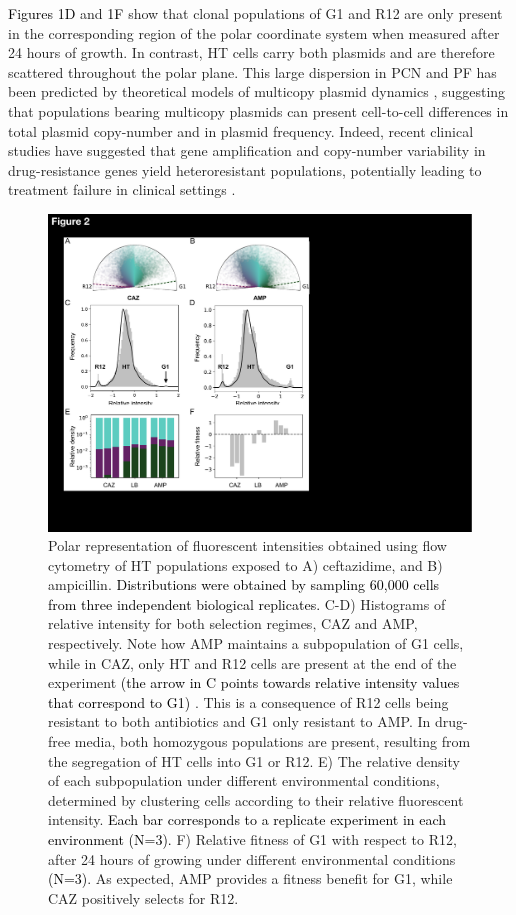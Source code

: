 \documentclass[fleqn,12pt]{wlscirep}
\newcommand{\blue}[1]{\textcolor{black}{#1}}
\newcommand{\fig}[1]{\textcolor{black}{#1}}
\begin{document}
 \fig{Figures 1D} and \fig{1F} show that clonal populations of G1 and R12 are only present in the corresponding region of the polar coordinate system when measured after 24 hours of growth.  
In contrast, HT cells carry both plasmids and are therefore scattered throughout the polar plane. This large dispersion in PCN and PF has been predicted by theoretical models of multicopy plasmid dynamics \cite{pena2015evaluating, Munch2019}, suggesting that populations bearing multicopy plasmids can present cell-to-cell differences in total plasmid copy-number and in plasmid frequency. 
Indeed, recent clinical studies have suggested that gene amplification and copy-number variability in drug-resistance genes yield heteroresistant populations\cite{andersson2019mechanisms}, potentially leading to treatment failure in clinical settings \cite{nicoloff2019high,wang2014heteroresistance, band2019heteroresistance}.

\begin{figure}[ht!]
\centering
\includegraphics[width=.66\linewidth]{figures/Figure2.pdf}
\caption{ \small{ Polar representation of fluorescent intensities obtained using flow cytometry of HT populations exposed to A) ceftazidime, and B) ampicillin. \blue{Distributions were obtained by sampling 60,000 cells from three independent biological replicates.}  C-D) Histograms of relative intensity for both selection regimes, CAZ and AMP, respectively.  Note how AMP maintains a subpopulation of G1 cells, while in CAZ, only HT and R12 cells are present at the end of the experiment \blue{(the arrow in C points towards relative intensity values that correspond to G1)} . This is a consequence of R12 cells being resistant to both antibiotics and G1 only resistant to AMP. In drug-free media, both homozygous populations are present, resulting from the segregation of HT cells into G1 or R12. E) The relative density of each subpopulation under different environmental conditions, determined by clustering cells according to their relative fluorescent intensity. \blue{Each bar corresponds to a replicate experiment in each environment (N=3).} F) Relative fitness of G1 with respect to R12, after 24 hours of growing under different environmental conditions \blue{(N=3)}. As expected, AMP provides a fitness benefit for G1, while CAZ positively selects for R12. }}
\label{fig:AMNIS}
\end{figure}
\end{document}

